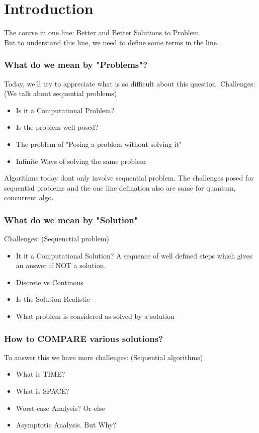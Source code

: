 \chapter{Introduction}

The course in one line: Better and Better Solutions to Problem.\\

But to understand this line, we need to define some terms in the
line. 

\subsection{What do we mean by "Problems"?}

Today, we'll try to appreciate what is so difficult
about this question. Challenges: (We talk about sequential problems)

\begin{itemize}
    \item Is it a Computational Problem?
    \item Is the problem well-posed?
    \item The problem of "Posing a problem without solving it"
    \item Infinite Ways of solving the same problem
\end{itemize}

Algorithms today dont only involve sequential problem. The 
challenges posed for sequential problems and the one line defination
also are same for quantum, concurrent algo.

\subsection{What do we mean by "Solution"}

Challenges: (Sequenctial problem)

\begin{itemize}
    \item It it a Computational Solution?
        A sequence of well defined steps which gives an answer
        if NOT a solution.
    \item Discrete vs Continous
    \item Is the Solution Realistic
    \item What problem is considered as solved by a solution
\end{itemize}

\subsection{How to COMPARE various solutions?}

To answer this we have more challenges: (Sequential algorithms)

\begin{itemize}
    \item What is TIME?
    \item What is SPACE?
    \item Worst-case Analysis? Or-else
    \item Asymptotic Analysis. But Why?
\end{itemize}
